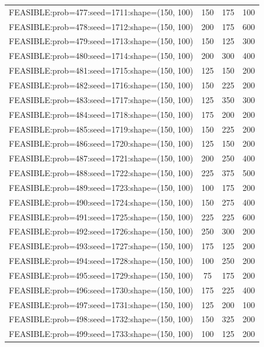 \begin{longtable}{lccc}
FEASIBLE:prob=477:seed=1711:shape=(150, 100) &      150 &   175 &    100 \\
FEASIBLE:prob=478:seed=1712:shape=(150, 100) &      200 &   175 &    600 \\
FEASIBLE:prob=479:seed=1713:shape=(150, 100) &      150 &   125 &    300 \\
FEASIBLE:prob=480:seed=1714:shape=(150, 100) &      200 &   300 &    400 \\
FEASIBLE:prob=481:seed=1715:shape=(150, 100) &      125 &   150 &    200 \\
FEASIBLE:prob=482:seed=1716:shape=(150, 100) &      150 &   225 &    200 \\
FEASIBLE:prob=483:seed=1717:shape=(150, 100) &      125 &   350 &    300 \\
FEASIBLE:prob=484:seed=1718:shape=(150, 100) &      175 &   200 &    200 \\
FEASIBLE:prob=485:seed=1719:shape=(150, 100) &      150 &   225 &    200 \\
FEASIBLE:prob=486:seed=1720:shape=(150, 100) &      125 &   150 &    200 \\
FEASIBLE:prob=487:seed=1721:shape=(150, 100) &      200 &   250 &    400 \\
FEASIBLE:prob=488:seed=1722:shape=(150, 100) &      225 &   375 &    500 \\
FEASIBLE:prob=489:seed=1723:shape=(150, 100) &      100 &   175 &    200 \\
FEASIBLE:prob=490:seed=1724:shape=(150, 100) &      150 &   275 &    400 \\
FEASIBLE:prob=491:seed=1725:shape=(150, 100) &      225 &   225 &    600 \\
FEASIBLE:prob=492:seed=1726:shape=(150, 100) &      250 &   300 &    200 \\
FEASIBLE:prob=493:seed=1727:shape=(150, 100) &      175 &   125 &    200 \\
FEASIBLE:prob=494:seed=1728:shape=(150, 100) &      100 &   250 &    200 \\
FEASIBLE:prob=495:seed=1729:shape=(150, 100) &       75 &   175 &    200 \\
FEASIBLE:prob=496:seed=1730:shape=(150, 100) &      175 &   225 &    400 \\
FEASIBLE:prob=497:seed=1731:shape=(150, 100) &      125 &   200 &    100 \\
FEASIBLE:prob=498:seed=1732:shape=(150, 100) &      150 &   325 &    200 \\
FEASIBLE:prob=499:seed=1733:shape=(150, 100) &      100 &   125 &    200 \\

\end{longtable}
